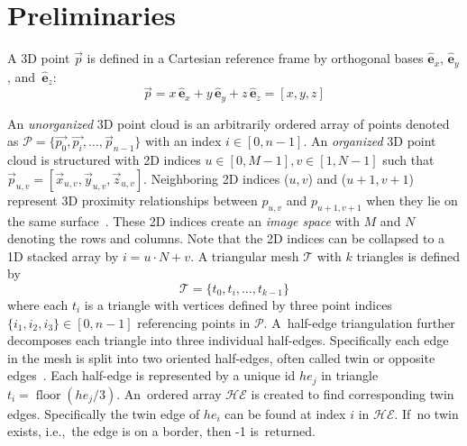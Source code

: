 
\section{Preliminaries}\label{sec:ch3_prelim}

A 3D point $ \vec{{p}}$ is defined in a Cartesian reference frame by orthogonal bases $\hat{\mathbf{e}}_x$,  $\hat{\mathbf{e}}_y$,  and~$\hat{\mathbf{e}}_z$:
\begin{equation}
\label{eq:ch3_point}
    \vec{{p}}=x\,\hat{\mathbf{e}}_x + y\, \hat{\mathbf{e}}_y + z\, \hat{\mathbf{e}}_z= [x,y,z]
\end{equation}

An \emph{unorganized} 3D point cloud is an arbitrarily ordered array of points denoted as $\mathcal{P}=\{ \vec{{p}_{0}}, \vec{{p}_{i}}, \ldots, \vec{{p}}_{n-1} \}$ with an index $i \in [0, n-1]$.
An \emph{organized} 3D point cloud is structured with 2D indices $u \in [0, M -1], v \in [1, N -1]$ such that $\vec{p}_{u,v} = [\vec{x}_{u,v}, \vec{y}_{u,v}, \vec{z}_{u,v}]$.   Neighboring 2D indices ($u,v$) and ($u+1, v+1$) represent 3D proximity relationships between $p_{u,v}$ and $p_{u+1,v+1}$ when they lie on the same surface~\cite{feng_fast_2014}. These 2D indices create an \emph{image space} with $M$ and $N$ denoting the rows and columns. 
Note that the 2D indices can be collapsed to a 1D stacked array by $i = u \cdot N + v$. %
 A triangular mesh $ \mathcal{T}$ with $k$ triangles is defined by
\begin{equation}
\label{eq:ch3_tri}
    \mathcal{T} = \{ t_0, t_i, \ldots, t_{k-1} \}
\end{equation}
where each $t_i$ is a triangle with vertices defined by three point indices $\{i_1, i_2, i_3\} \in \left[0,n-1\right]$ referencing points in $\mathcal{P}$. A~half-edge triangulation further decomposes each triangle into three individual half-edges. Specifically each edge in the mesh is split into two oriented half-edges, often called twin or opposite edges~\cite{paris_modified_2013}. Each half-edge is represented by a unique id $he_j$ in triangle $t_i = \operatorname{floor}(he_j/3)$. An~ordered array $\mathcal{HE}$ is created to find corresponding twin edges. Specifically the twin edge of $he_i$ can be found at index $i$ in $\mathcal{HE}$. If~no twin exists, i.e.,~the edge is on a border, then -1 is~returned.

